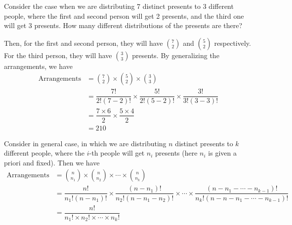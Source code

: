 \begin{eg}
    Consider the case when we are distributing 7 distinct presents to 3 different people, where the first and second person will get 2 presents, and the third one will get 3 presents. How many different distributions of the presents are there?

    Then, for the first and second person, they will have \(\binom{7}{2}\) and \(\binom{5}{2}\) respectively. For the third person, they will have \(\binom{3}{3}\) presents. By generalizing the arrangements, we have 
    \[
    \begin{aligned}
        \text{Arrangements} &= \binom{7}{2} \times \binom{5}{2} \times \binom{3}{3} \\
        &= \dfrac{7!}{2!(7 - 2)!} \times \dfrac{5!}{2!(5 - 2)!} \times \dfrac{3!}{3!(3 - 3)!} \\
        &= \dfrac{7 \times 6}{2} \times \dfrac{5 \times 4}{2} \\
        &= 210
    \end{aligned}
    \]
\end{eg}
\begin{corollary}
    Consider in general case, in which we are distributing \(n\) distinct presents to \(k\) different people, where the \(i\)-th people will get \(n_i\) presents (here \(n_i\) is given a priori and fixed). Then we have 
\[
    \begin{aligned}
        \text{Arrangements} &= \binom{n}{n_1} \times \binom{n}{n_2} \times \cdots \times \binom{n}{n_k} \\
        &= \dfrac{n!}{n_1!(n - n_1)!} \times \dfrac{(n - n_1)!}{n_2!(n - n_1 - n_2)!} \times \cdots \times \dfrac{(n - n_1 - \cdots - n_{k - 1})!}{n_k!(n - n - n_1 - \cdots - n_{k - 1})!} \\
        &= \dfrac{n!}{n_1! \times n_2! \times \cdots \times n_k!}
    \end{aligned}
\]
\end{corollary}

